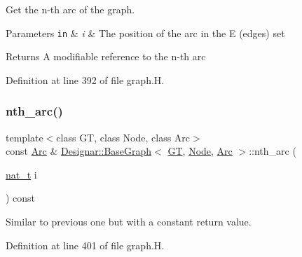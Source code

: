 Get the n-\/th arc of the graph. 


\begin{DoxyParams}[1]{Parameters}
\mbox{\tt in}  & {\em i} & The position of the arc in the E (edges) set \\
\hline
\end{DoxyParams}
\begin{DoxyReturn}{Returns}
A modifiable reference to the n-\/th arc 
\end{DoxyReturn}


Definition at line 392 of file graph.\+H.

\mbox{\label{class_designar_1_1_base_graph_a2253d6f1e0d163f52ce1b928001e830d}} 
\subsubsection{\texorpdfstring{nth\+\_\+arc()}{nth\_arc()}\hspace{0.1cm}{\footnotesize\ttfamily [2/2]}}
{\footnotesize\ttfamily template$<$class GT, class Node, class Arc$>$ \\
const \hyperlink{namespace_designar_a3f55fb5513d62ff47cbc8f72b8e95d6f}{Arc} \& \hyperlink{class_designar_1_1_base_graph}{Designar\+::\+Base\+Graph}$<$ \hyperlink{demo-buildgraph_8_c_a3001c40d2c31ca87ed96cd7d1334a55e}{GT}, \hyperlink{namespace_designar_a5af326c65aa2bd26b26c410f2030d09e}{Node}, \hyperlink{namespace_designar_a3f55fb5513d62ff47cbc8f72b8e95d6f}{Arc} $>$\+::nth\+\_\+arc (\begin{DoxyParamCaption}\item[{\hyperlink{namespace_designar_aa72662848b9f4815e7bf31a7cf3e33d1}{nat\+\_\+t}}]{i }\end{DoxyParamCaption}) const\hspace{0.3cm}{\ttfamily [inline]}}



Similar to previous one but with a constant return value. 



Definition at line 401 of file graph.\+H.

\mbox{\label{class_designar_1_1_base_graph_ae4b7d560477f0b860d127a6ace6956e5}} 
